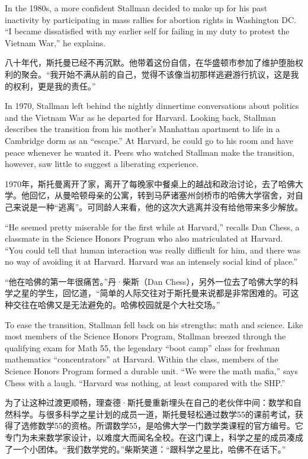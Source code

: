 \ifdefined\vtwo
\ifdefined\eng
In the 1980s, a more confident Stallman decided to make up for his past inactivity by participating in mass rallies for abortion rights in Washington DC.  ``I became dissatisfied with my earlier self for failing in my duty to protest the Vietnam War,'' he explains.
\fi

\ifdefined\chs
八十年代，斯托曼已经不再沉默。他带着这份自信，在华盛顿市参加了维护堕胎权利的聚会。``我开始不满从前的自己，觉得不该像当初那样逃避游行抗议，这是我的权利，更是我的责任。''
\fi
\fi

\ifdefined\eng
In 1970, Stallman left behind the nightly dinnertime conversations about politics and the Vietnam War as he departed for Harvard. Looking back, Stallman describes the transition from his mother's Manhattan apartment to life in a Cambridge dorm as an ``escape.'' \ifdefined\vtwo At Harvard, he could go to his room and have peace whenever he wanted it. \fi Peers who watched Stallman make the transition, however, saw little to suggest a liberating experience.
\fi

\ifdefined\chs
1970年，斯托曼离开了家，离开了每晚家中餐桌上的越战和政治讨论，去了哈佛大学。他回忆，从曼哈顿母亲的公寓，转到马萨诸塞州剑桥市的哈佛大学宿舍，对自己来说是一种``逃离''。可同龄人来看，他的这次大逃离并没有给他带来多少解放。
\fi

\ifdefined\eng
``He seemed pretty miserable for the first while at Harvard,'' recalls Dan Chess, a classmate in the Science Honors Program who also matriculated at Harvard. ``You could tell that human interaction was really difficult for him, and there was no way of avoiding it at Harvard. Harvard was an intensely social kind of place.''
\fi

\ifdefined\chs
``他在哈佛的第一年很痛苦。''丹·柴斯（Dan
Chess），另外一位去了哈佛大学的科学之星的学生，回忆道，``简单的人际交往对于斯托曼来说都是非常困难的。可这种交往在哈佛又是无法避免的。哈佛校园就是个大社交场。''
\fi

\ifdefined\eng
To ease the transition, Stallman fell back on his strengths: math and science. Like most members of the Science Honors Program, Stallman breezed through the qualifying exam for Math 55, the legendary ``boot camp'' class for freshman mathematics ``concentrators'' at Harvard. Within the class, members of the Science Honors Program formed a durable unit. ``We were the math mafia,'' says Chess with a laugh. ``Harvard was nothing, at least compared with the SHP.''
\fi

\ifdefined\chs
为了让这种过渡更顺畅，理查德·斯托曼重新埋头在自己的老伙伴中间：数学和自然科学。与很多科学之星计划的成员一道，斯托曼轻松通过数学55的课前考试，获得了选修数学55的资格。所谓数学55，是哈佛大学一门数学类课程的官方编号。它专门为未来数学家设计，以难度大而闻名全校。在这门课上，科学之星的成员凑成了一个小团体。``我们数学党的。''柴斯笑道：``跟科学之星比，哈佛不在话下。''
\fi

